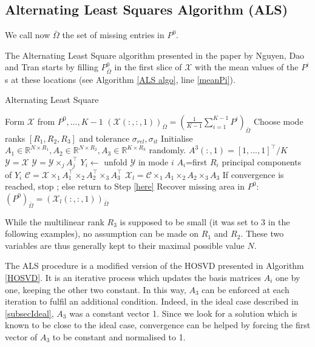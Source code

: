 \documentclass[a4paper, 11pt]{article} %
\def \X {\mathcal{X}}
\def \R {\mathbb{R}}
\def \t {\times}
\def \Y {\mathcal{Y}}
\def \C {\mathcal{C}}
\def \Xl {\mathcal{X}_{l}}
\def \bO{\bar{\Omega}}
\begin{document}
\subsection{Alternating Least Squares Algorithm (ALS)}
We call now $\bar{\Omega}$ the set of missing entries in $P^0$.

The Alternating Least Square algorithm presented in the paper by Nguyen, Dao and Tran \cite{ALS} starts by filling $P^0_{\bO}$ in the first slice of $\X$ with the mean values of the $P^i$s at these locations (see Algorithm \ref{ALS algo}, line \ref{meanPi}).

\begin{algorithm}
\caption{Alternating Least Square}\label{ALS algo}
\begin{algorithmic}[1]
\State Form $\X$ from $P^0,...,K-1$ 
\State $(\X(:,:,1))_{\bO}=(\frac{1}{K-1}\sum_{i=1}^{K-1}P^i)_{\bO}$ \label{meanPi}
\State Choose mode ranks $[R_1, R_2, R_3]$ and tolerance $\sigma_{rel}, \sigma_{it}$
\State Initialise $A_1 \in \R^{N\t R_1}, A_2\in \R^{N\t R_2}, A_3\in \R^{K\t R_3}$ randomly.
\State $A^3(:,1)=[1,...,1]^{\top}/K$ \label{here}
\State $\Y=\X$
	\State $\Y=\Y\t_j A_j^\top$
\EndFor
\State$Y_i\gets$  unfold $\Y$ in mode $i$
\State $A_i$=first $R_i$ principal components of $Y_i$
\EndFor
\State $\C=\X\t_1 A_1^{\top}\t_2 A_2^{\top}\t_3 A_3^{\top}$
\State $\X_l=\C\t_1 A_1 \t_2 A_2 \t_3 A_3$ \label{line Xl}
\State If convergence is reached, stop ; else return to Step \ref{here}
\State Recover missing area in $P^0$: $(P^0)_{\bO}=(\Xl(:,:,1))_{\bO}$
\end{algorithmic}
\end{algorithm}

While the multilinear rank $R_3$ is supposed to be small (it was set to 3 in the following examples), no assumption can be made on $R_1$ and $R_2$. These two variables are thus generally kept to their maximal possible value $N$.

The ALS procedure is a modified version of the HOSVD presented in Algorithm \autoref{HOSVD}. It is an iterative process which updates the basis matrices $A_i$ one by one, keeping the other two constant. In this way, $A_3$ can be enforced at each iteration to fulfil an additional condition.
Indeed, in the ideal case described in \autoref{subsecIdeal}, $A_3$ was a constant vector 1. Since we look for a solution which is known to be close to the ideal case, convergence can be helped by forcing the first vector of $A_3$ to be constant and normalised to 1.
\end{document}
